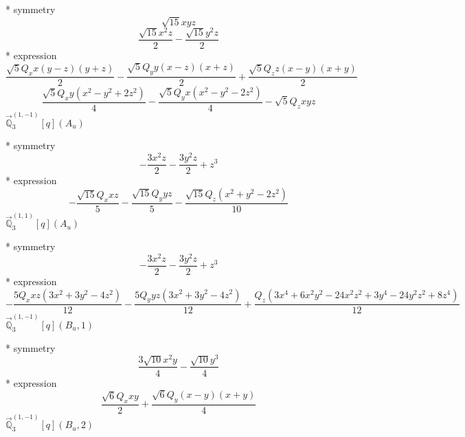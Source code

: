 \documentclass[fleqn,8pt]{jsarticle}
\begin{document}
\noindent\quad ** symmetry
\begin{dmath*}
\sqrt{15} x y z
\end{dmath*}
\begin{dmath*}
\frac{\sqrt{15} x^{2} z}{2} - \frac{\sqrt{15} y^{2} z}{2}
\end{dmath*}
\noindent\quad ** expression
\begin{dmath*}
\frac{\sqrt{5} Q_{x} x \left(y - z\right) \left(y + z\right)}{2} - \frac{\sqrt{5} Q_{y} y \left(x - z\right) \left(x + z\right)}{2} + \frac{\sqrt{5} Q_{z} z \left(x - y\right) \left(x + y\right)}{2}
\end{dmath*}
\begin{dmath*}
\frac{\sqrt{5} Q_{x} y \left(x^{2} - y^{2} + 2 z^{2}\right)}{4} - \frac{\sqrt{5} Q_{y} x \left(x^{2} - y^{2} - 2 z^{2}\right)}{4} - \sqrt{5} Q_{z} x y z
\end{dmath*}
\noindent\quad $\vec{\mathbb{Q}}_{3}^{(1,-1)}[q](A_{u})$

\noindent\quad ** symmetry
\begin{dmath*}
- \frac{3 x^{2} z}{2} - \frac{3 y^{2} z}{2} + z^{3}
\end{dmath*}
\noindent\quad ** expression
\begin{dmath*}
- \frac{\sqrt{15} Q_{x} x z}{5} - \frac{\sqrt{15} Q_{y} y z}{5} - \frac{\sqrt{15} Q_{z} \left(x^{2} + y^{2} - 2 z^{2}\right)}{10}
\end{dmath*}
\noindent\quad $\vec{\mathbb{Q}}_{3}^{(1,1)}[q](A_{u})$

\noindent\quad ** symmetry
\begin{dmath*}
- \frac{3 x^{2} z}{2} - \frac{3 y^{2} z}{2} + z^{3}
\end{dmath*}
\noindent\quad ** expression
\begin{dmath*}
- \frac{5 Q_{x} x z \left(3 x^{2} + 3 y^{2} - 4 z^{2}\right)}{12} - \frac{5 Q_{y} y z \left(3 x^{2} + 3 y^{2} - 4 z^{2}\right)}{12} + \frac{Q_{z} \left(3 x^{4} + 6 x^{2} y^{2} - 24 x^{2} z^{2} + 3 y^{4} - 24 y^{2} z^{2} + 8 z^{4}\right)}{12}
\end{dmath*}
\noindent\quad $\vec{\mathbb{Q}}_{3}^{(1,-1)}[q](B_{u},1)$

\noindent\quad ** symmetry
\begin{dmath*}
\frac{3 \sqrt{10} x^{2} y}{4} - \frac{\sqrt{10} y^{3}}{4}
\end{dmath*}
\noindent\quad ** expression
\begin{dmath*}
\frac{\sqrt{6} Q_{x} x y}{2} + \frac{\sqrt{6} Q_{y} \left(x - y\right) \left(x + y\right)}{4}
\end{dmath*}
\noindent\quad $\vec{\mathbb{Q}}_{3}^{(1,-1)}[q](B_{u},2)$
\end{document}

